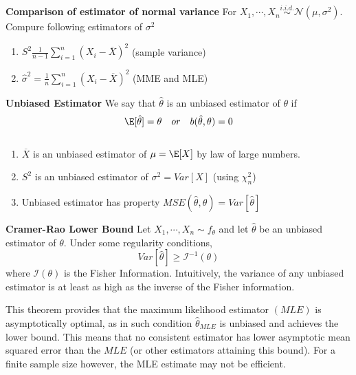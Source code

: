 \documentclass[11pt]{article}
\begin{document}
\begin{defn*}
  \textbf{Comparison of estimator of normal variance} For $X_1, \cdots, X_n \stackrel{i.i.d.}{\sim} \mathcal{N}(\mu, \sigma^2)$. Compure following estimators of $\sigma^2$
  \begin{enumerate}
    \item $S^2 \frac{1}{n-1} \sum_{i=1}^n (X_i - \overline{X})^2$ (sample variance)
    \item $\hat{\sigma}^2 = \frac{1}{n} \sum_{i=1}^n (X_i - \overline{X})^2$ (MME and MLE)
  \end{enumerate}
\end{defn*}

\begin{defn*}
  \textbf{Unbiased Estimator} We say that $\hat{\theta}$ is an unbiased estimator of $\theta$ if
  \[
    \E[\hat{\theta}] = \theta \quad { or }\quad b(\hat{\theta}, \theta) = 0
  \]
  \begin{rem}
    $ $\\
    \begin{enumerate}
      \item $\overline{X}$ is an unbiased estimator of $\mu =\E[X]$ by law of large numbers.
      \item $S^2$ is an unbiased estimator of $\sigma^2 = Var[X]$ (using $\chi_n^2$)
      \item Unbiased estimator has property $MSE(\hat{\theta},\theta) = Var[\hat{\theta}]$
    \end{enumerate}
  \end{rem}
\end{defn*}

\begin{theorem*}
  \textbf{Cramer-Rao Lower Bound} Let $X_1, \cdots, X_n \sim f_{\theta}$ and let $\hat{\theta}$ be an unbiased estimator of $\theta$. Under some regularity conditions,
  \[
    Var[\hat{\theta}] \geq \mathcal{I}^{-1}(\theta)
  \]
  where $\mathcal{I}(\theta)$ is the Fisher Information. Intuitively, the variance of any unbiased estimator is at least as high as the inverse of the Fisher information.
  \begin{rem}
    This theorem provides that the maximum likelihood estimator $(MLE)$ is asymptotically optimal, as in such condition $\hat{\theta}_{ MLE}$ is unbiased and achieves the lower bound. This means that no consistent estimator has lower asymptotic mean squared error than the $MLE$ (or other estimators attaining this bound). For a finite sample size however, the MLE estimate may not be efficient.
  \end{rem}
\end{theorem*}
\end{document}
